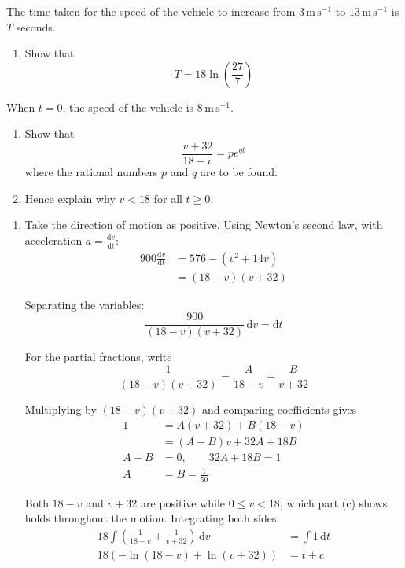 \documentclass[leqno]{article}
\begin{document}
\begin{enumerate}[
  label=\textbf{\arabic*.},
  leftmargin=*,
  topsep=0pt,
  partopsep=0pt,
  parsep=0pt
]
The time taken for the speed of the vehicle to increase from $3\,\mathrm{m\,s^{-1}}$ to $13\,\mathrm{m\,s^{-1}}$ is $T$ seconds. \\

\begin{enumerate}[label=\textbf{(\alph*)}]
  \item Show that
  \[
  T=18\ln\left(\frac{27}{7}\right)
  \]
\end{enumerate}
When $t=0$, the speed of the vehicle is $8\,\mathrm{m\,s^{-1}}$. \\
\begin{enumerate}[label=\textbf{(\alph*)}, resume]
  \item Show that
  \[
  \frac{v+32}{18-v}=pe^{qt}
  \]
  where the rational numbers $p$ and $q$ are to be found.  \\
  \item Hence explain why $v<18$ for all $t\geq 0$.  \\
\end{enumerate}

\vspace*{10pt}

\begin{djsSolution}
\begin{enumerate}[label=\textbf{(\alph*)}, start=1]
\item Take the direction of motion as positive. Using Newton's second law, with acceleration \(a=\frac{\mathrm{d}v}{\mathrm{d}t}\):
\begin{align*}
900\frac{\mathrm{d}v}{\mathrm{d}t}
&=576-(v^2+14v)\\
&=(18-v)(v+32)
\end{align*}

Separating the variables:
\[
\frac{900}{(18-v)(v+32)}\,\mathrm{d}v=\mathrm{d}t
\]

For the partial fractions, write
\[
\frac{1}{(18-v)(v+32)}=\frac{A}{18-v}+\frac{B}{v+32}
\]

Multiplying by \((18-v)(v+32)\) and comparing coefficients gives
\begin{align*}
1&=A(v+32)+B(18-v)\\
&=(A-B)v+32A+18B\\
A-B&=0,\qquad 32A+18B=1\\
A&=B=\frac{1}{50}
\end{align*}

Both \(18-v\) and \(v+32\) are positive while \(0\leq v<18\), which part (c) shows holds throughout the motion. Integrating both sides:
\begin{align*}
18\int\left(\frac{1}{18-v}+\frac{1}{v+32}\right)\,\mathrm{d}v
&=\int 1\,\mathrm{d}t\\
18\left(-\ln(18-v)+\ln(v+32)\right)&=t+c
\end{align*}


\end{enumerate}
\end{djsSolution}
\end{enumerate}
\end{document}
